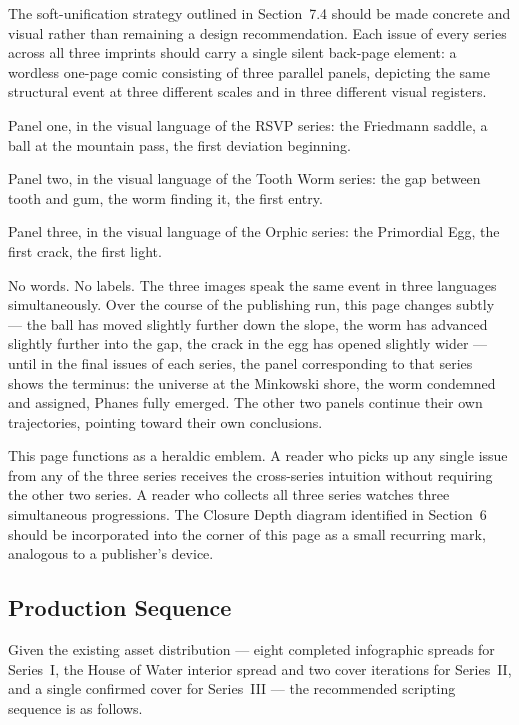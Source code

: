 \documentclass[12pt, a4paper]{article}
\begin{document}
The soft-unification strategy outlined in Section~7.4 should be made concrete and visual rather than remaining a design recommendation. Each issue of every series across all three imprints should carry a single silent back-page element: a wordless one-page comic consisting of three parallel panels, depicting the same structural event at three different scales and in three different visual registers.

Panel one, in the visual language of the RSVP series: the Friedmann saddle, a ball at the mountain pass, the first deviation beginning.

Panel two, in the visual language of the Tooth Worm series: the gap between tooth and gum, the worm finding it, the first entry.

Panel three, in the visual language of the Orphic series: the Primordial Egg, the first crack, the first light.

No words. No labels. The three images speak the same event in three languages simultaneously. Over the course of the publishing run, this page changes subtly --- the ball has moved slightly further down the slope, the worm has advanced slightly further into the gap, the crack in the egg has opened slightly wider --- until in the final issues of each series, the panel corresponding to that series shows the terminus: the universe at the Minkowski shore, the worm condemned and assigned, Phanes fully emerged. The other two panels continue their own trajectories, pointing toward their own conclusions.

This page functions as a heraldic emblem. A reader who picks up any single issue from any of the three series receives the cross-series intuition without requiring the other two series. A reader who collects all three series watches three simultaneous progressions. The Closure Depth diagram identified in Section~6 should be incorporated into the corner of this page as a small recurring mark, analogous to a publisher's device.

\subsection{Production Sequence}

Given the existing asset distribution --- eight completed infographic spreads for Series~I, the House of Water interior spread and two cover iterations for Series~II, and a single confirmed cover for Series~III --- the recommended scripting sequence is as follows.
\end{document}
